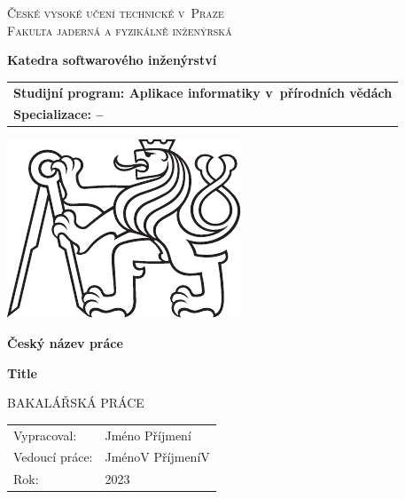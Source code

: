\documentclass[a4paper,oneside,12pt]{book}
\newcommand{\tb}{\textbf} %
\newcommand{\cvut}{České vysoké učení technické v~Praze}
\newcommand{\fjfi}{Fakulta jaderná a fyzikálně inženýrská}
\newcommand{\katedra}{Katedra softwarového inženýrství}
\newcommand{\program}{Aplikace informatiky v~přírodních vědách} %
\newcommand{\spec}{--} %
\newcommand{\druh}{Bakalářská práce} %
\newcommand{\logoCVUT}{\includegraphics{symbol_cvut_konturova_verze_cb.pdf}} %
\newcommand{\nazevcz}{Český název práce}    %
\newcommand{\nazeven}{Title}          %
\newcommand{\autor}{Jméno Příjmení}   %
\newcommand{\vedouci}{JménoV PříjmeníV} %
\newcommand{\rok}{2023}  %
\begin{document}
\thispagestyle{empty}

\begin{center}
    {\Large \textsc{\cvut}\\[4mm] \textsc{\fjfi}}\par
    \vspace{4mm}
	\tb{\katedra} \par\vspace{3mm}

    \begin{tabular}{l}
		\tb{Studijní program: \program}\\
		\tb{Specializace: \spec}\\
    \end{tabular}

   \vspace{10mm} \logoCVUT \vspace{15mm} 

   {\huge \tb{\nazevcz}\par}
   \vspace{5mm}   
   {\huge \tb{\nazeven}\par}
   
   \vspace{15mm}
   {\Large \MakeUppercase{\druh}}

   \vfill
   {\large
    \begin{tabular}{ll}
    Vypracoval: & \autor\\
    Vedoucí práce: & \vedouci\\
    Rok: & \rok
    \end{tabular}
   }
\end{center}

\newpage  %
\thispagestyle{empty} %

\end{document}
